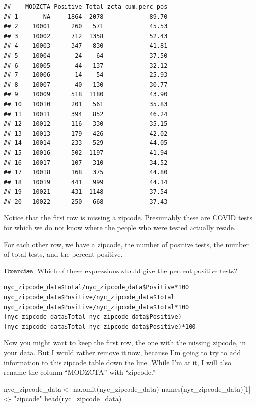 \documentclass[
  openany]{book}
\newenvironment{Shaded}{\begin{snugshade}}{\end{snugshade}}
\newcommand{\DecValTok}[1]{\textcolor[rgb]{0.00,0.00,0.81}{#1}}
\newcommand{\FunctionTok}[1]{\textcolor[rgb]{0.00,0.00,0.00}{#1}}
\newcommand{\NormalTok}[1]{#1}
\newcommand{\OtherTok}[1]{\textcolor[rgb]{0.56,0.35,0.01}{#1}}
\newcommand{\StringTok}[1]{\textcolor[rgb]{0.31,0.60,0.02}{#1}}
\begin{document}
\begin{verbatim}
##    MODZCTA Positive Total zcta_cum.perc_pos
## 1       NA     1864  2078             89.70
## 2    10001      260   571             45.53
## 3    10002      712  1358             52.43
## 4    10003      347   830             41.81
## 5    10004       24    64             37.50
## 6    10005       44   137             32.12
## 7    10006       14    54             25.93
## 8    10007       40   130             30.77
## 9    10009      518  1180             43.90
## 10   10010      201   561             35.83
## 11   10011      394   852             46.24
## 12   10012      116   330             35.15
## 13   10013      179   426             42.02
## 14   10014      233   529             44.05
## 15   10016      502  1197             41.94
## 16   10017      107   310             34.52
## 17   10018      168   375             44.80
## 18   10019      441   999             44.14
## 19   10021      431  1148             37.54
## 20   10022      250   668             37.43
\end{verbatim}

Notice that the first row is missing a zipcode. Presumably these are COVID tests for which we do not know where the people who were tested actually reside.

For each other row, we have a zipcode, the number of positive tests, the number of total tests, and the percent positive.

\textbf{Exercise}: Which of these expressions should give the percent positive tests?

\begin{verbatim}
nyc_zipcode_data$Total/nyc_zipcode_data$Positive*100
nyc_zipcode_data$Positive/nyc_zipcode_data$Total
nyc_zipcode_data$Positive/nyc_zipcode_data$Total*100
(nyc_zipcode_data$Total-nyc_zipcode_data$Positive)
(nyc_zipcode_data$Total-nyc_zipcode_data$Positive)*100
\end{verbatim}

Now you might want to keep the first row, the one with the missing zipcode, in your data. But I would rather remove it now, because I'm going to try to add information to this zipcode table down the line. While I'm at it, I will also rename the column ``MODZCTA'' with ``zipcode.''

\begin{Shaded}
\begin{Highlighting}[]
\NormalTok{nyc\_zipcode\_data }\OtherTok{\textless{}{-}} \FunctionTok{na.omit}\NormalTok{(nyc\_zipcode\_data)}
\FunctionTok{names}\NormalTok{(nyc\_zipcode\_data)[}\DecValTok{1}\NormalTok{] }\OtherTok{\textless{}{-}} \StringTok{"zipcode"}
\FunctionTok{head}\NormalTok{(nyc\_zipcode\_data)}
\end{Highlighting}
\end{Shaded}
\end{document}

